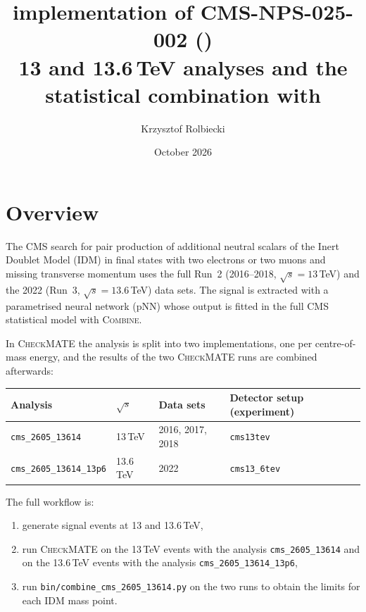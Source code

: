 \documentclass[11pt,a4paper]{article}
\title{\cm{} implementation of CMS-NPS-025-002 (\file{cms\_2605\_13614})\\[0.3em]
\large 13 and 13.6\,TeV analyses and the statistical combination with \combine{}}
\author{Krzysztof Rolbiecki}
\date{October 2026}
\newcommand{\cm}{\textsc{CheckMATE}}
\newcommand{\combine}{\textsc{Combine}}
\newcommand{\file}[1]{\texttt{#1}}
\begin{document}
\maketitle
\tableofcontents

\section{Overview}

The CMS search for pair production of additional neutral scalars of the
Inert Doublet Model (IDM) in final states with two electrons or two muons
and missing transverse momentum uses the full Run~2 (2016--2018,
$\sqrt{s}=13$\,TeV) and the 2022 (Run~3, $\sqrt{s}=13.6$\,TeV) data sets.
The signal is extracted with a parametrised neural network (pNN) whose
output is fitted in the full CMS statistical model with \combine{}.

In \cm{} the analysis is split into two implementations, one per
centre-of-mass energy, and the results of the two \cm{} runs are combined
afterwards:

\begin{center}
\begin{tabular}{llll}
\toprule
Analysis & $\sqrt{s}$ & Data sets & Detector setup (experiment) \\
\midrule
\file{cms\_2605\_13614}      & 13\,TeV   & 2016, 2017, 2018 & \file{cms13tev} \\
\file{cms\_2605\_13614\_13p6} & 13.6\,TeV & 2022             & \file{cms13\_6tev} \\
\bottomrule
\end{tabular}
\end{center}

The full workflow is:
\begin{enumerate}
  \item generate signal events at 13 and 13.6\,TeV,
  \item run \cm{} on the 13\,TeV events with the analysis
        \file{cms\_2605\_13614} and on the 13.6\,TeV events with the
        analysis \file{cms\_2605\_13614\_13p6},
  \item run \file{bin/combine\_cms\_2605\_13614.py} on the two runs to
        obtain the limits for each IDM mass point.
\end{enumerate}

\end{document}
